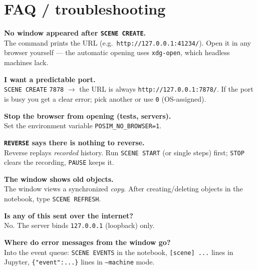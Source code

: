 \documentclass[11pt]{article}
\newcommand{\kw}[1]{\texttt{\uppercase{#1}}}
\newcommand{\code}[1]{\texttt{#1}}
\begin{document}
\section{FAQ / troubleshooting}

\textbf{No window appeared after \kw{scene create}.}\\
The command prints the URL (e.g.\ \code{http://127.0.0.1:41234/}).
Open it in any browser yourself --- the automatic opening uses
\code{xdg-open}, which headless machines lack.

\textbf{I want a predictable port.}\\
\kw{scene create} \code{7878} $\to$ the URL is always
\code{http://127.0.0.1:7878/}. If the port is busy you get a clear
error; pick another or use \code{0} (OS-assigned).

\textbf{Stop the browser from opening (tests, servers).}\\
Set the environment variable \code{POSIM\_NO\_BROWSER=1}.

\textbf{\kw{reverse} says there is nothing to reverse.}\\
Reverse replays \emph{recorded} history. Run \kw{scene start} (or
single steps) first; \kw{stop} clears the recording, \kw{pause}
keeps it.

\textbf{The window shows old objects.}\\
The window views a synchronized \emph{copy}. After creating/deleting
objects in the notebook, type \kw{scene refresh}.

\textbf{Is any of this sent over the internet?}\\
No. The server binds \code{127.0.0.1} (loopback) only.

\textbf{Where do error messages from the window go?}\\
Into the event queue: \kw{scene events} in the notebook,
\code{[scene] ...} lines in Jupyter, \code{\{"event":...\}} lines in
\code{--machine} mode.
\end{document}
